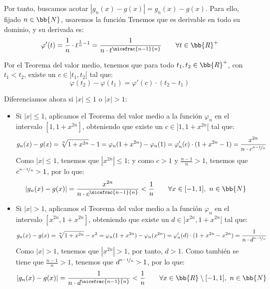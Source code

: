 \begin{ejercicio}
    Por tanto, buscamos acotar $|g_n(x)-g(x)|=g_n(x)-g(x)$. Para ello, fijado $n\in \bb{N}$, usaremos la función
    Tenemos que es derivable en todo su dominio, y su derivada es:
    \begin{equation*}
        \varphi'(t) = \frac{1}{n}\cdot t^{\frac{1}{n}-1}
        = \frac{1}{n\cdot t^{\nicefrac{n-1}{n}}} \qquad \forall t\in \bb{R}^+
    \end{equation*}

    Por el Teorema del valor medio, tenemos que para todo $t_1,t_2\in \bb{R}^+$, con $t_1<t_2$, existe un $c\in ]t_1,t_2[$ tal que:
    \begin{equation*}
        \varphi(t_2)-\varphi(t_1) = \varphi'(c)\cdot (t_2-t_1)
    \end{equation*}

    Diferenciamos ahora si $|x|\leq 1$ o $|x|>1$:
    \begin{itemize}
        \item Si $|x|\leq 1$, aplicamos el Teorema del valor medio a la función $\varphi_n$ en el intervalo $[1,1+x^{2n}]$,
        obteniendo que existe un $c\in ]1,1+x^{2n}[$ tal que:
        \begin{equation*}
            g_n(x)-g(x)=\sqrt[n]{1+x^{2n}}-1 = \varphi_n(1+x^{2n})-\varphi_n(1) = \varphi_n'(c)\cdot (1+x^{2n}-1)
            = \frac{x^{2n}}{n\cdot c^{\nicefrac{n-1}{n}}}
        \end{equation*}
        Como $|x|\leq 1$, tenemos que $|x^{2n}|\leq 1$; y como $c>1$ y $\frac{n-1}{n}>1$, tenemos que $c^{\nicefrac{n-1}{n}}>1$, por lo que:
        \begin{equation*}
            |g_n(x)-g(x)| = \frac{x^{2n}}{n\cdot c^{\nicefrac{n-1}{n}}}< \frac{1}{n} \qquad \forall x\in [-1,1],~n\in \bb{N}
        \end{equation*}

        \item Si $|x|>1$, aplicamos el Teorema del valor medio a la función $\varphi_n$ en el intervalo $[x^{2n},1+x^{2n}]$,
        obteniendo que existe un $d\in ]x^{2n},1+x^{2n}[$ tal que:
        \begin{equation*}
            g_n(x)-g(x)=\sqrt[n]{1+x^{2n}}-x^2 = \varphi_n(1+x^{2n})-\varphi_n(x^{2n}) = \varphi_n'(d)\cdot (1+x^{2n}-x^{2n})
            = \frac{1}{n\cdot d^{\nicefrac{n-1}{n}}}
        \end{equation*}
        Como $|x|>1$, tenemos que $|x^{2n}|>1$, por tanto, $d>1$. Como también se tiene que $\frac{n-1}{n}>1$, tenemos que $d^{\nicefrac{n-1}{n}}>1$, por lo que:
        \begin{equation*}
            |g_n(x)-g(x)| = \frac{1}{n\cdot d^{\nicefrac{n-1}{n}}}< \frac{1}{n} \qquad \forall x\in \bb{R}\setminus [-1,1],~n\in \bb{N}
        \end{equation*}
    \end{itemize}


\end{ejercicio}
